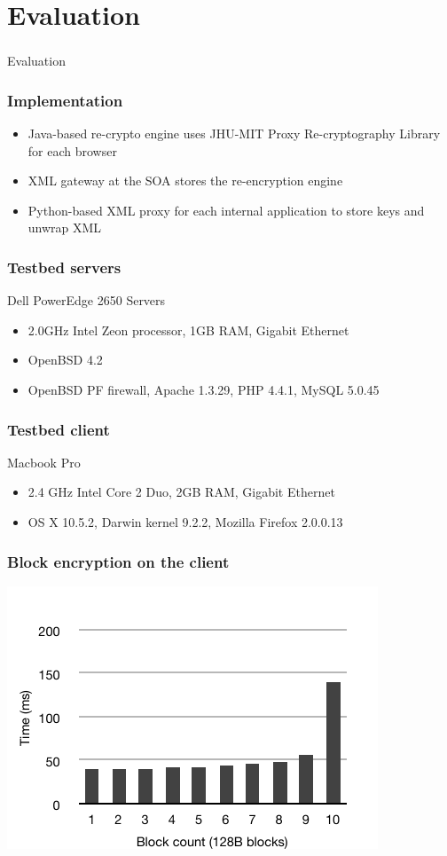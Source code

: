 \documentclass{beamer}
\begin{document}
\section{Evaluation}
\begin{frame}
\frametitle{}
\begin{center}
\Large{Evaluation}
\end{center}
\end{frame}

\begin{frame}
\frametitle{Implementation}
\begin{itemize}
\item Java-based re-crypto engine uses JHU-MIT Proxy Re-cryptography Library
for each browser 
\item XML gateway at the SOA stores the re-encryption engine 
\item Python-based XML proxy for each internal application to store keys and
unwrap XML
\end{itemize}
\end{frame}

\begin{frame}
\frametitle{Testbed servers}
Dell PowerEdge 2650 Servers
\begin{itemize}
\item 2.0GHz Intel Zeon processor, 1GB RAM, Gigabit Ethernet
\item OpenBSD 4.2
\item OpenBSD PF firewall, Apache 1.3.29, PHP 4.4.1, MySQL 5.0.45 
\end{itemize}
\end{frame}

\begin{frame}
\frametitle{Testbed client}
Macbook Pro
\begin{itemize}
\item 2.4 GHz Intel Core 2 Duo, 2GB RAM, Gigabit Ethernet
\item OS X 10.5.2, Darwin kernel 9.2.2, Mozilla Firefox 2.0.0.13
\end{itemize}
\end{frame}

\begin{frame}
\frametitle{Block encryption on the client}
\begin{center}
\includegraphics{client_field_count_new} \\
\end{center}
\end{frame}
\end{document}
